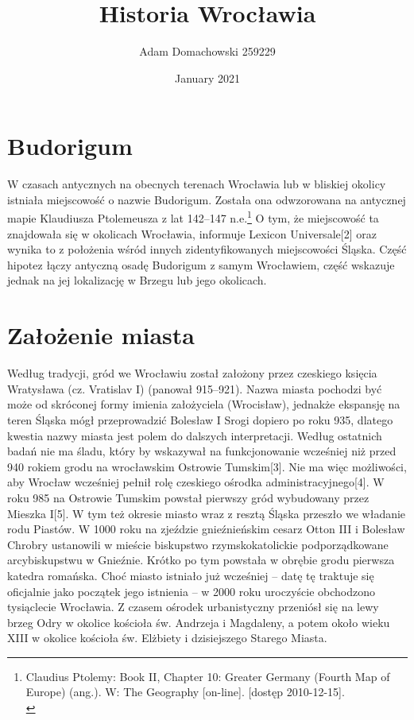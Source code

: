 \documentclass{article}
\title{Historia Wrocławia}
\author{ Adam Domachowski 259229 }
\date{January 2021}
\begin{document}
\maketitle
\tableofcontents

\section{Budorigum}
W czasach antycznych na obecnych terenach Wrocławia lub w bliskiej okolicy istniała miejscowość o nazwie Budorigum. Została ona odwzorowana na antycznej mapie Klaudiusza Ptolemeusza z lat 142–147 n.e.\footnote{Claudius Ptolemy: Book II, Chapter 10: Greater Germany (Fourth Map of Europe) (ang.). W: The Geography [on-line]. [dostęp 2010-12-15].\\} O tym, że miejscowość ta znajdowała się w okolicach Wrocławia, informuje Lexicon Universale[2] oraz wynika to z położenia wśród innych zidentyfikowanych miejscowości Śląska. Część hipotez łączy antyczną osadę Budorigum z samym Wrocławiem, część wskazuje jednak na jej lokalizację w Brzegu lub jego okolicach.











\section{Założenie miasta}
Według tradycji, gród we Wrocławiu został założony przez czeskiego księcia Wratysława (cz. Vratislav I) (panował 915–921). Nazwa miasta pochodzi być może od skróconej formy imienia założyciela (Wrocisław), jednakże ekspansję na teren Śląska mógł przeprowadzić Bolesław I Srogi dopiero po roku 935, dlatego kwestia nazwy miasta jest polem do dalszych interpretacji. Według ostatnich badań nie ma śladu, który by wskazywał na funkcjonowanie wcześniej niż przed 940 rokiem grodu na wrocławskim Ostrowie Tumskim[3]. Nie ma więc możliwości, aby Wrocław wcześniej pełnił rolę czeskiego ośrodka administracyjnego[4]. W roku 985 na Ostrowie Tumskim powstał pierwszy gród wybudowany przez Mieszka I[5]. W tym też okresie miasto wraz z resztą Śląska przeszło we władanie rodu Piastów.
\vspace{3mm} %
\newline W 1000 roku na zjeździe gnieźnieńskim cesarz Otton III i Bolesław Chrobry ustanowili w mieście biskupstwo rzymskokatolickie podporządkowane arcybiskupstwu w Gnieźnie. Krótko po tym powstała w obrębie grodu pierwsza katedra romańska. Choć miasto istniało już wcześniej – datę tę traktuje się oficjalnie jako początek jego istnienia – w 2000 roku uroczyście obchodzono tysiąclecie Wrocławia. Z czasem ośrodek urbanistyczny przeniósł się na lewy brzeg Odry w okolice kościoła św. Andrzeja i Magdaleny, a potem około wieku XIII w okolice kościoła św. Elżbiety i dzisiejszego Starego Miasta.
\end{document}
